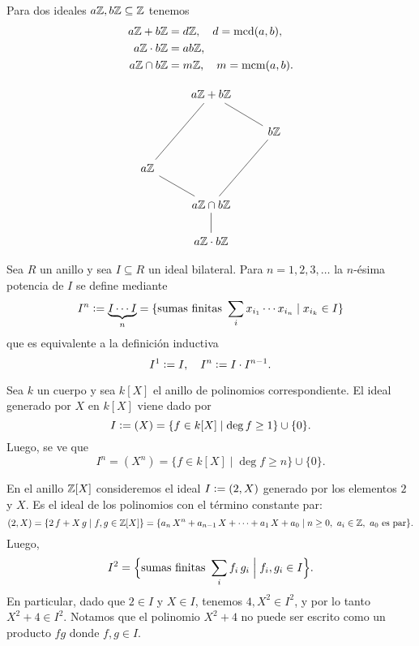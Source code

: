 \begin{ejemplo}
  Para dos ideales $a\mathbb{Z}, b\mathbb{Z} \subseteq \mathbb{Z}$ tenemos
  \begin{align*}
    a\mathbb{Z} + b\mathbb{Z} & = d\mathbb{Z}, \quad d = \operatorname{mcd} (a,b),\\
    a\mathbb{Z}\cdot b\mathbb{Z} & = ab\mathbb{Z},\\
    a\mathbb{Z} \cap b\mathbb{Z} & = m\mathbb{Z}, \quad m = \operatorname{mcm} (a,b).
  \end{align*}

  \[ \begin{tikzcd}
      & a\ZZ + b\ZZ\ar[-]{dr}\ar[-]{ddl} \\
      & & b\ZZ\ar[-]{ddl} \\
      a\ZZ\ar[-]{dr} \\
      & a\ZZ\cap b\ZZ\ar[-]{d} \\
      & a\ZZ\cdot b\ZZ
    \end{tikzcd} \]
\end{ejemplo}

\begin{definicion}
  Sea $R$ un anillo y sea $I \subseteq R$ un ideal bilateral. Para
  $n = 1,2,3,\ldots$ la $n$-ésima potencia de $I$ se define mediante
  \[ I^n \mathrel{\mathop:}= \underbrace{I \cdots I}_n =
     \{ \text{sumas finitas }\sum_i x_{i_1}\cdots x_{i_n}\mid x_{i_k}\in I \} \]
  que es equivalente a la definición inductiva
  $$I^1 \mathrel{\mathop:}= I, \quad I^n \mathrel{\mathop:}= I\cdot I^{n-1}.$$ 
\end{definicion}

\begin{ejemplo}
  Sea $k$ un cuerpo y sea $k [X]$ el anillo de polinomios correspondiente.
  El ideal generado por $X$ en $k [X]$ viene dado por
  $$I \mathrel{\mathop:}= (X) = \{ f\in k [X] \mid \deg f \ge 1 \} \cup \{ 0 \}.$$
  Luego, se ve que
  $$I^n = (X^n) = \{ f\in k [X] \mid \deg f \ge n \} \cup \{ 0 \}.$$
\end{ejemplo}

\begin{ejemplo}
  En el anillo $\mathbb{Z} [X]$ consideremos el ideal $I \mathrel{\mathop:}= (2,X)$ generado por
  los elementos $2$ y $X$. Es el ideal de los polinomios con el término
  constante par:
  \[ (2,X) = \{ 2\,f + X\,g \mid f,g \in \mathbb{Z} [X] \} =
             \{ a_n\,X^n + a_{n-1}\,X + \cdots + a_1\,X + a_0 \mid
                n\ge 0, ~ a_i\in\mathbb{Z}, ~ a_0\text{ es par} \}. \]
  Luego,
  \[ I^2 = \Bigl\{ \text{sumas finitas }\sum_i f_i\,g_i \Bigm|
                   f_i,g_i \in I \Bigr\}. \]
  En particular, dado que $2\in I$ y $X \in I$, tenemos $4, X^2 \in I^2$, y por
  lo tanto $X^2 + 4 \in I^2$. Notamos que el polinomio $X^2 + 4$ no puede ser
  escrito como un producto $fg$ donde $f,g\in I$.
\end{ejemplo}

